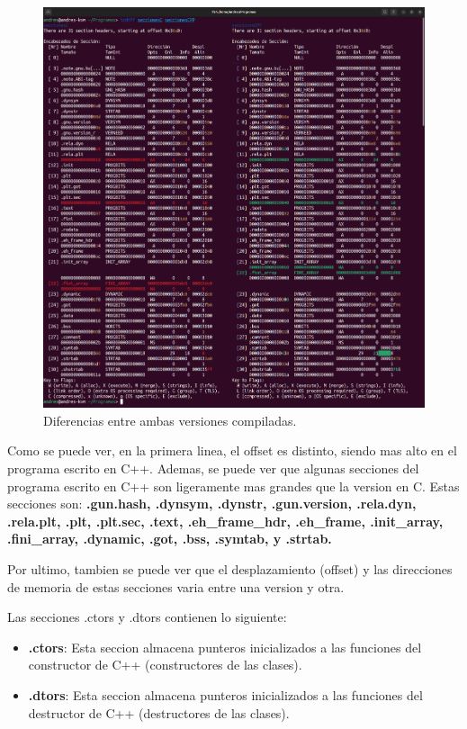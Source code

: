 \documentclass{article}
\begin{document}
\begin{figure}[H]
    \includegraphics[width=\textwidth]{imagenes/icdiff/mergedicdiff.png}
    \caption{Diferencias entre ambas versiones compiladas.}
\end{figure}

Como se puede ver, en la primera linea, el offset es distinto, siendo mas alto en el programa escrito en C++. Ademas, se puede ver que algunas secciones del programa escrito en C++ son ligeramente mas grandes que la version en C. Estas secciones son: \textbf{.gun.hash, .dynsym, .dynstr, .gun.version, .rela.dyn, .rela.plt, .plt, .plt.sec, .text, .eh\_frame\_hdr, .eh\_frame, .init\_array, .fini\_array, .dynamic, .got, .bss, .symtab, y .strtab.}

\bigskip

Por ultimo, tambien se puede ver que el desplazamiento (offset) y las direcciones de memoria de estas secciones varia entre una version y otra.


\bigskip

Las secciones .ctors y .dtors contienen lo siguiente:

\begin{itemize}
    \item \textbf{.ctors}: Esta seccion almacena punteros inicializados a las funciones del constructor de C++ (constructores de las clases).
    \item \textbf{.dtors}: Esta seccion almacena punteros inicializados a las funciones del destructor de C++ (destructores de las clases).
\end{itemize}
\end{document}

